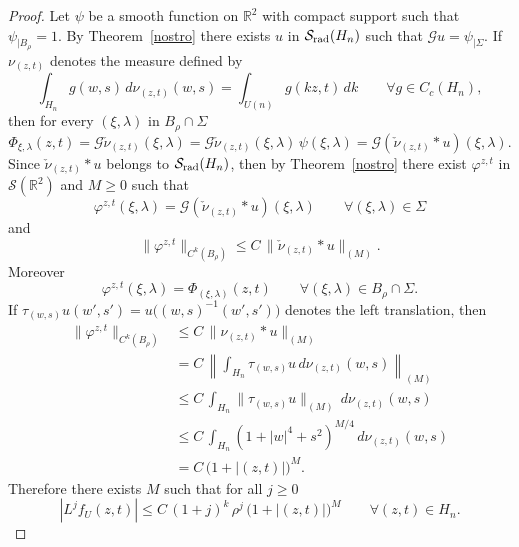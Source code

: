 \documentclass[12pt,a4paper]{amsart}
\theoremstyle{plain}
\theoremstyle{definition}
\numberwithin{equation}{section}
\begin{document}
\begin{proof}
Let $\psi$ be a smooth function on ${\mathbb R}^2$ with compact support such that $\psi_{|{B_\rho} }=1$. By Theorem~\ref{nostro} there exists $u$ in ${{\mathcal S}_{\text{\rm rad}}({{H_{n}}})}$ such that ${\mathcal G} u=\psi_{|{\Sigma}}$. If  
$\nu_{(z,t)}$ denotes the measure defined by 
$$
\int_{{H_{n}}} g(w,s)\, d\nu_{(z,t)}(w,s)=
\int_{U(n)} g(kz,t)\, dk \qquad\forall g\in C_c({{H_{n}}}),
$$
then for every $(\xi,{\lambda})$ in $B_\rho\cap {\Sigma}$
$$
\Phi_{\xi,{\lambda}}(z,t)
={\mathcal G}{\check\nu_{(z,t)}}(\xi,{\lambda})=
{\mathcal G}{\check\nu_{(z,t)}}(\xi,{\lambda})\, \psi(\xi,{\lambda})=
{\mathcal G}\left(\check\nu_{(z,t)}\ast u
\right)(\xi,{\lambda})
.
$$
Since $\check\nu_{(z,t)}\ast u$ belongs to $ {{\mathcal S}_{\text{\rm rad}}({{H_{n}}})}$, then by Theorem~\ref{nostro} there exist
$\varphi^{z,t}$ in $ {\mathcal S}({\mathbb R}^2)$ and  $M\geq 0$ such that 
$$
\varphi^{z,t}(\xi,{\lambda})={\mathcal G}\left(\check\nu_{(z,t)}\ast u
\right)(\xi,{\lambda})
\qquad \forall(\xi,{\lambda})\in   {\Sigma}
$$
and 
$$
 \|\varphi^{z,t}
      \|_{C^k(B_\rho)}\leq C \, \|\check\nu_{(z,t)}\ast u\|_{(M)}.
$$
Moreover
$$
\varphi^{z,t}(\xi,{\lambda})= \Phi_{(\xi,{\lambda})}(z,t)
\qquad \forall(\xi,{\lambda})\in  B_\rho\cap{\Sigma}.
$$
If 
$ \tau_{(w,s)}u(w',s')=u\big((w,s)^{-1}(w',s')\big)$ denotes the left translation, then
 \begin{align*}
\|\varphi^{z,t}
      \|_{C^k(B_\rho)}
      &\leq {  C \, \|\nu_{(z,t)}\ast u\|_{(M)}
}
\\
&=C \, 
{ \left\|\int_{{H_{n}}} \tau_{(w,s)}u\, d\nu_{(z,t)}(w,s)\right\|_{(M)}}
 \\
&\leq C \, 
  \int_{{H_{n}}} \|\tau_{(w,s)}u\|_{(M)}\, d\nu_{(z,t)}(w,s)
   \\
&\leq C \, 
{   \int_{{H_{n}}} (1+|w|^4+s^2)^{M/4}\, d\nu_{(z,t)}(w,s)
}
  \\
  &=    C \, \big(1+|(z,t)|\big)^{M}.
\end{align*}
Therefore there exists $M$ such that for all $j\geq 0$ 
$$
 \left|
     L^j f_U(z,t)
     \right|
     \leq C \,(1+j)^k\, \rho^j\, \big(1+|(z,t)|\big)^{M}
\qquad\forall (z,t)\in {{H_{n}}}.
$$


\end{proof}
\end{document}
